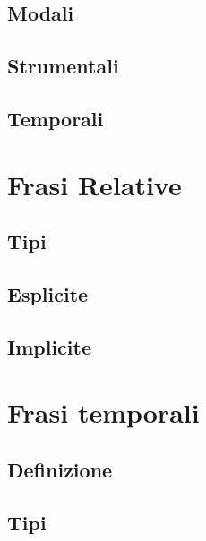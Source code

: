 \documentclass[
  a4paper,
  twoside,
  11pt,
  chapterprefix=false,
  bibliography=totocnumbered,
  listof=flat]{scrbook}
\begin{document}
\hypertarget{modali}{%
\section{Modali}\label{modali}}

\hypertarget{strumentali}{%
\section{Strumentali}\label{strumentali}}

\hypertarget{temporali}{%
\section{Temporali}\label{temporali}}

\hypertarget{frasi-relative}{%
\chapter{Frasi Relative}\label{frasi-relative}}

\hypertarget{tipi}{%
\section{Tipi}\label{tipi}}

\hypertarget{esplicite}{%
\section{Esplicite}\label{esplicite}}

\hypertarget{implicite}{%
\section{Implicite}\label{implicite}}

\hypertarget{frasi-temporali}{%
\chapter{Frasi temporali}\label{frasi-temporali}}

\hypertarget{definizione}{%
\section{Definizione}\label{definizione}}

\hypertarget{tipi-1}{%
\section{Tipi}\label{tipi-1}}
\end{document}
